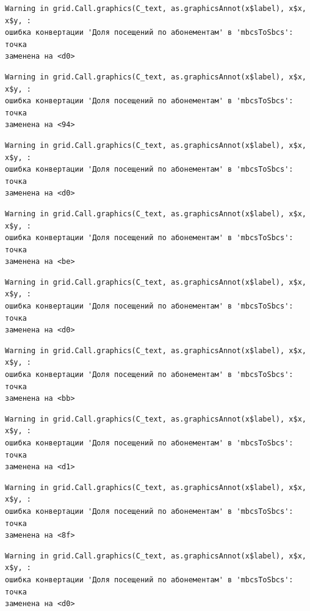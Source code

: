 \documentclass[
  letterpaper,
  DIV=11,
  numbers=noendperiod]{scrreprt}
\begin{document}
\begin{verbatim}
Warning in grid.Call.graphics(C_text, as.graphicsAnnot(x$label), x$x, x$y, :
ошибка конвертации 'Доля посещений по абонементам' в 'mbcsToSbcs': точка
заменена на <d0>
\end{verbatim}

\begin{verbatim}
Warning in grid.Call.graphics(C_text, as.graphicsAnnot(x$label), x$x, x$y, :
ошибка конвертации 'Доля посещений по абонементам' в 'mbcsToSbcs': точка
заменена на <94>
\end{verbatim}

\begin{verbatim}
Warning in grid.Call.graphics(C_text, as.graphicsAnnot(x$label), x$x, x$y, :
ошибка конвертации 'Доля посещений по абонементам' в 'mbcsToSbcs': точка
заменена на <d0>
\end{verbatim}

\begin{verbatim}
Warning in grid.Call.graphics(C_text, as.graphicsAnnot(x$label), x$x, x$y, :
ошибка конвертации 'Доля посещений по абонементам' в 'mbcsToSbcs': точка
заменена на <be>
\end{verbatim}

\begin{verbatim}
Warning in grid.Call.graphics(C_text, as.graphicsAnnot(x$label), x$x, x$y, :
ошибка конвертации 'Доля посещений по абонементам' в 'mbcsToSbcs': точка
заменена на <d0>
\end{verbatim}

\begin{verbatim}
Warning in grid.Call.graphics(C_text, as.graphicsAnnot(x$label), x$x, x$y, :
ошибка конвертации 'Доля посещений по абонементам' в 'mbcsToSbcs': точка
заменена на <bb>
\end{verbatim}

\begin{verbatim}
Warning in grid.Call.graphics(C_text, as.graphicsAnnot(x$label), x$x, x$y, :
ошибка конвертации 'Доля посещений по абонементам' в 'mbcsToSbcs': точка
заменена на <d1>
\end{verbatim}

\begin{verbatim}
Warning in grid.Call.graphics(C_text, as.graphicsAnnot(x$label), x$x, x$y, :
ошибка конвертации 'Доля посещений по абонементам' в 'mbcsToSbcs': точка
заменена на <8f>
\end{verbatim}

\begin{verbatim}
Warning in grid.Call.graphics(C_text, as.graphicsAnnot(x$label), x$x, x$y, :
ошибка конвертации 'Доля посещений по абонементам' в 'mbcsToSbcs': точка
заменена на <d0>
\end{verbatim}
\end{document}
